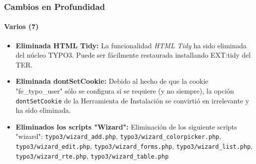 \begin{frame}[fragile]
	\frametitle{Cambios en Profundidad}
	\framesubtitle{Varios (7)}

	\begin{itemize}

		\item \textbf{Eliminada HTML Tidy:}\newline
			\small
				La funcionalidad \textit{HTML Tidy} ha sido eliminada del núcleo TYPO3. Puede ser fácilmente restaurada installando EXT:tidy del TER.
			\normalsize

		\item \textbf{Eliminada dontSetCookie:}\newline
			\small
				Debido al hecho de que la cookie "fe\_typo\_user" sólo se configura si se requiere (y no siempre), la opción \texttt{dontSetCookie} de la Herramienta de Instalación se convirtió en irrelevante y ha sido eliminada.
			\normalsize

		\item \textbf{Eliminados los scripts "Wizard":}\newline
			\small
				Eliminación de los siguiente scripts "wizard":
				\texttt{typo3/wizard\_add.php}, \texttt{typo3/wizard\_colorpicker.php}, \texttt{typo3/wizard\_edit.php}, \texttt{typo3/wizard\_forms.php}, \texttt{typo3/wizard\_list.php}, \texttt{typo3/wizard\_rte.php}, \texttt{typo3/wizard\_table.php}
			\normalsize

	\end{itemize}

\end{frame}


